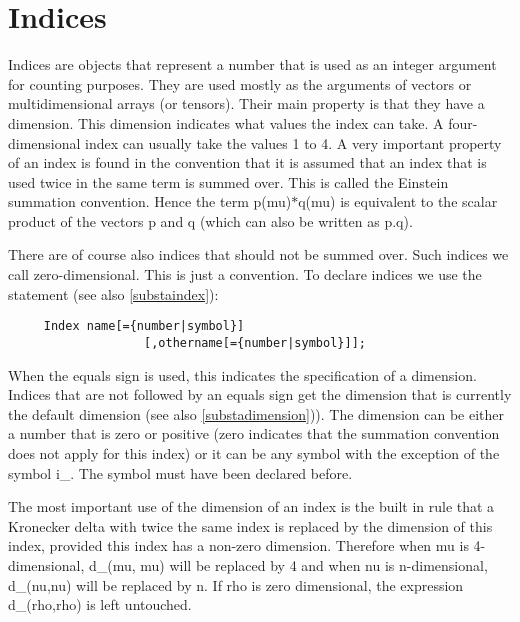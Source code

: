 \section{Indices}

\label{sect-indices}
Indices are objects that represent a number 
that is used as an integer argument for counting purposes. They are used 
mostly as the arguments of vectors or multidimensional arrays (or tensors). 
Their main property is that they have a dimension. This 
dimension indicates what values the index can take. A four-dimensional 
index can usually take the values 1 to 4. A very important property of an 
index is found in the convention that it is assumed that an index that is 
used twice in the same term is summed over. This is called the 
Einstein summation convention. 
Hence the term p(mu)$*$q(mu) is equivalent to the scalar product of the 
vectors p and q (which can also be written as p.q). 

There are of course also indices that should not be summed over. 
Such indices we call zero-dimensional. This is just a convention. 
To declare indices we use the statement (see also \ref{substaindex}): 
\begin{verbatim}
     Index name[={number|symbol}]
                   [,othername[={number|symbol}]];
\end{verbatim}
When the equals sign is used, this indicates the specification of a 
dimension. Indices that are not followed by an equals sign get the 
dimension that is currently the default dimension (see also 
\ref{substadimension})). The dimension can be either a number that is 
zero or positive (zero indicates that the summation convention does not 
apply for this index) or it can be any symbol with the exception of the 
symbol i\_. The symbol must have been declared before. 

The most important use of the dimension of an index is the built in rule 
that a Kronecker delta with twice 
the same index is replaced by the dimension of this index, provided this 
index has a non-zero dimension. Therefore when mu is 4-dimensional, d\_(mu,
mu) will be replaced by 4 and when nu is n-dimensional, d\_(nu,nu) will be 
replaced by n. If rho is zero dimensional, the expression d\_(rho,rho) is 
left untouched.

